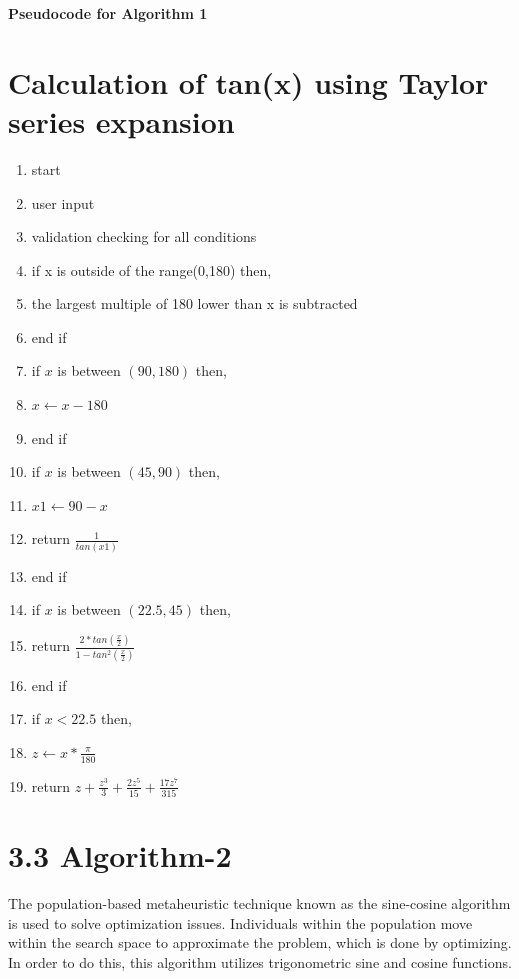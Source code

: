 \documentclass[12pt]{article}
\begin{document}
\pagebreak
\noindent
\textbf{Pseudocode for Algorithm 1}
\section*{Calculation of tan(x) using Taylor series expansion}


\begin{enumerate}
    \item start
    \item \indent user input
    \item validation checking for all conditions
    \item if x is outside of the range(0,180) then,
    \item \hspace*{10mm} the largest multiple of 180 lower than x is subtracted 
    \item end if
    \item if $ x$ is between $(90, 180)$ then,
    \item \hspace*{10mm} $ x  \leftarrow x - 180 $
    \item end if
    \item if $ x $ is between $(45, 90)$ then,
    \item \hspace*{10mm} $x1 \leftarrow 90 - x $
    \item \hspace*{10mm} return $ \frac{1}{ tan(x1) }  $
    \item end if
    \item if $ x $ is between $(22.5, 45)$ then,
    \item \hspace{10mm} return $ \frac{ 2*tan(\frac{x}{2})}{1 - tan^2(\frac{x}{2})}$
    \item end if 
    \item if $ x < 22.5 $ then,
    \item \hspace{10mm} $ z \leftarrow x * \frac{\pi}{180} $
    \item \hspace{10mm} return $ z + \frac{z^3}{3} + \frac{2z^5}{15} + \frac{17z^7}{315} $
\end{enumerate}
\newpage

\section*{3.3 Algorithm-2 \cite{baeldung_sincos}\cite{hindawi_link}}
The population-based metaheuristic technique known as the sine-cosine algorithm is used to solve optimization issues. Individuals within the population move within the search space to approximate the problem, which is done by optimizing. In order to do this, this algorithm utilizes trigonometric sine and cosine functions.
\newline
\end{document}
